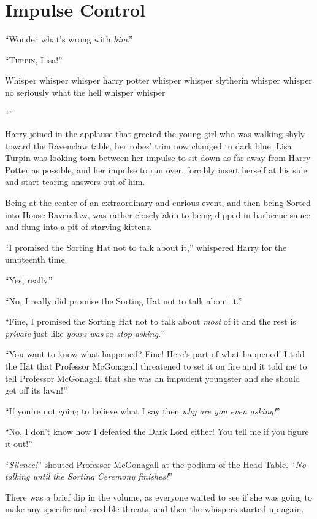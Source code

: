 \chapter{Impulse Control}

\epigraph{“Wonder what’s wrong with \emph{him}.”}{}

\lettrine{“T}{urpin,} Lisa!”

\quad\quad Whisper whisper whisper harry potter whisper whisper slytherin whisper whisper no seriously what the hell whisper whisper

“”

Harry joined in the applause that greeted the young girl who was walking shyly toward the Ravenclaw table, her robes’ trim now changed to dark blue. Lisa Turpin was looking torn between her impulse to sit down as far away from Harry Potter as possible, and her impulse to run over, forcibly insert herself at his side and start tearing answers out of him.

Being at the center of an extraordinary and curious event, and then being Sorted into House Ravenclaw, was rather closely akin to being dipped in barbecue sauce and flung into a pit of starving kittens.

“I promised the Sorting Hat not to talk about it,” whispered Harry for the umpteenth time.

“Yes, really.”

“No, I really did promise the Sorting Hat not to talk about it.”

“Fine, I promised the Sorting Hat not to talk about \emph{most} of it and the rest is \emph{private} just like \emph{yours was} so \emph{stop asking.}”

“You want to know what happened? Fine! Here’s part of what happened! I told the Hat that Professor McGonagall threatened to set it on fire and it told me to tell Professor McGonagall that she was an impudent youngster and she should get off its lawn!”

“If you’re not going to believe what I say then \emph{why are you even asking!}”

“No, I don’t know how I defeated the Dark Lord either! You tell me if you figure it out!”

“\emph{Silence!}” shouted Professor McGonagall at the podium of the Head Table. “\emph{No talking until the Sorting Ceremony finishes!}”

There was a brief dip in the volume, as everyone waited to see if she was going to make any specific and credible threats, and then the whispers started up again.

